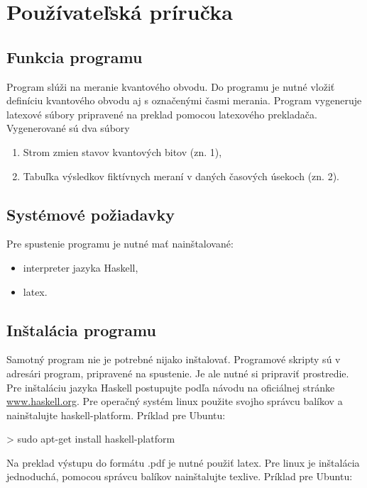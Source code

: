 
\chapter{Používateľská príručka}

\section{Funkcia programu}

Program slúži na meranie kvantového obvodu. Do programu je nutné vložiť 
definíciu kvantového obvodu aj s označenými časmi merania. Program vygeneruje
latexové súbory pripravené na preklad pomocou latexového prekladača. 
Vygenerované sú dva súbory
\begin{enumerate}
    \item Strom zmien stavov kvantových bitov (zn. 1),
    \item Tabuľka výsledkov fiktívnych meraní v daných časových úsekoch (zn. 2).
\end{enumerate}

\section{Systémové požiadavky}

Pre spustenie programu je nutné mať nainštalované: 
\begin{itemize}
    \item interpreter jazyka Haskell,
    \item latex.
\end{itemize}

\section{Inštalácia programu}

Samotný program nie je potrebné nijako inštalovať. Programové skripty sú v 
adresári program, pripravené na spustenie. Je ale nutné si pripraviť prostredie.
Pre inštaláciu jazyka Haskell postupujte podľa návodu na oficiálnej 
stránke \url{www.haskell.org}. Pre operačný systém linux použite svojho
správcu balíkov a nainštalujte haskell-platform. Príklad pre Ubuntu:

\begin{code}
> sudo apt-get install haskell-platform
\end{code}

Na preklad výstupu do formátu .pdf je nutné použiť latex. Pre linux je
inštalácia jednoduchá, pomocou správcu balíkov nainštalujte texlive. Príklad
pre Ubuntu:

